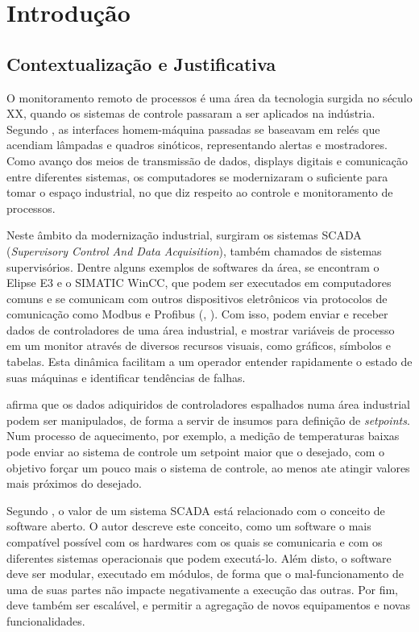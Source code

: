 \chapter{Introdução} \label{Chap:Introdução}

\section{Contextualização e Justificativa}

O monitoramento remoto de processos é uma área da tecnologia surgida no século XX, quando os sistemas de controle passaram a ser aplicados na indústria. Segundo , as interfaces homem-máquina passadas se baseavam em relés que acendiam lâmpadas e quadros sinóticos, representando alertas e mostradores. Como avanço dos meios de transmissão de dados, displays digitais e comunicação entre diferentes sistemas, os computadores se modernizaram o suficiente para tomar o espaço industrial, no que diz respeito ao controle e monitoramento de processos.

Neste âmbito da modernização industrial, surgiram os sistemas SCADA (\emph{Supervisory Control And Data Acquisition}), também chamados de sistemas supervisórios. Dentre alguns exemplos de softwares da área, se encontram o Elipse E3 e o SIMATIC WinCC, que podem ser executados em computadores comuns e se comunicam com outros dispositivos eletrônicos via protocolos de comunicação como Modbus e Profibus (\cite{Elipse2012}, \cite{Siemens1999}). Com isso, podem enviar e receber dados de controladores de uma área industrial, e mostrar variáveis de processo em um monitor através de diversos recursos visuais, como gráficos, símbolos e tabelas. Esta dinâmica facilitam a um operador entender rapidamente o estado de suas máquinas e identificar tendências de falhas.

 afirma que os dados adiquiridos de controladores espalhados numa área industrial podem ser manipulados, de forma a servir de insumos para definição de \emph{setpoints}. Num processo de aquecimento, por exemplo, a medição de temperaturas baixas pode enviar ao sistema de controle um setpoint maior que o desejado, com o objetivo forçar um pouco mais o sistema de controle, ao menos ate atingir valores mais próximos do desejado.

Segundo , o valor de um sistema SCADA está relacionado com o conceito de software aberto. O autor descreve este conceito, como um software o mais compatível possível com os hardwares com os quais se comunicaria e com os diferentes sistemas operacionais que podem executá-lo. Além disto, o software deve ser modular, executado em módulos, de forma que o mal-funcionamento de uma de suas partes não impacte negativamente a execução das outras. Por fim, deve também ser escalável, e permitir a agregação de novos equipamentos e novas funcionalidades.

